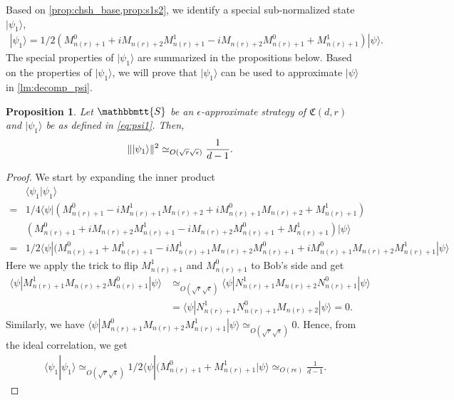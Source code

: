 \documentclass[11pt,letterpaper]{article}
\newcommand{\ket}[1]{|#1\rangle}
\newcommand{\bra}[1]{\langle#1|}
\newcommand{\braket}[2]{\langle#1|#2\rangle}
\DeclarePairedDelimiter{\norm}{\lVert}{\rVert}
\newcommand{\1}{\mathbb{1}}
\newcommand{\nr}{n(r)}
\newcommand{\fC}{\mathfrak{C}}
\newcommand{\bS}{\mathbbmtt{S}}
\newcommand{\ep}{\epsilon}
\newcommand{\se}{\sqrt{\epsilon}}
\newcommand{\qe}{\epsilon^{1/4}}
\newcommand{\sd}{\sqrt{d}}
\newcommand{\sr}{\sqrt{r}}
\newcommand{\appd}[1]{\simeq_{#1}}
\newtheorem{proposition}[theorem]{Proposition}
\theoremstyle{definition}
\begin{document}
Based on \cref{prop:chsh_base,prop:s1s2}, we identify a special sub-normalized state $\ket{\psi_1}$, 
\begin{align}
    \label{eq:psi1}
	\ket{\psi_1} =1/2(M_{\nr+1}^0 + iM_{\nr+2}M_{\nr+1}^1 - iM_{\nr+2}M_{\nr+1}^0 +M_{\nr+1}^1) \ket{\psi}.
\end{align}
The special properties of $\ket{\psi_1}$ are summarized
in the propositions below. 
Based on the properties of $\ket{\psi_1}$, we will prove that $\ket{\psi_1}$ can be used to approximate $\ket{\psi}$
in \cref{lm:decomp_psi}.
\begin{proposition}
    \label{prop:psi1_norm}
	Let $\bS$ be an $\ep$-approximate strategy of $\fC(d,r)$ and $\ket{\psi_1}$ be as defined in
	\cref{eq:psi1}.
	Then, 
	\begin{align}
	 \label{eq:psi1_norm} &\norm{\ket{\psi_1}}^2 \appd{O(\sr\se)} \frac{1}{d-1}.
	\end{align}
\end{proposition}
\begin{proof}
	We start by expanding the inner product
	\begin{align*}
		&\braket{\psi_1}{\psi_1} \\
		=&1/4\bra{\psi}(M_{\nr+1}^0 - iM_{\nr+1}^1M_{\nr+2} + iM_{\nr+1}^0M_{\nr+2} +M_{\nr+1}^1)\\
		&(M_{\nr+1}^0 + iM_{\nr+2}M_{\nr+1}^1 -iM_{\nr+2}M_{\nr+1}^0 + M_{\nr+1}^1)\ket{\psi}\\
		=&1/2\bra{\psi}(M_{\nr+1}^0+M_{\nr+1}^1-iM_{\nr+1}^1M_{\nr+2}M_{\nr+1}^0+iM_{\nr+1}^0M_{\nr+2}M_{\nr+1}^1\ket{\psi}
	\end{align*}
	Here we apply the trick to flip $M_{\nr+1}^1$ and $M_{\nr+1}^0$ to Bob's side and get 
	\begin{align*}
		\bra{\psi}M_{\nr+1}^1M_{\nr+2}M_{\nr+1}^0\ket{\psi} 
		&\appd{O(\sr\se)} \bra{\psi}N_{\nr+1}^1M_{\nr+2}N_{\nr+1}^0\ket{\psi} \\
		&= \bra{\psi}N_{\nr+1}^1N_{\nr+1}^0M_{\nr+2}\ket{\psi} = 0.
	\end{align*}
	Similarly, we have $\bra{\psi}M_{\nr+1}^0M_{\nr+2}M_{\nr+1}^1\ket{\psi} \appd{ O(\sr \se)} 0$.
	Hence, from the ideal correlation, we get 
	\begin{align}
		\braket{\psi_1}{\psi_1} \appd{O(\sr\se)} 1/2\bra{\psi}(M_{\nr+1}^0+M_{\nr+1}^1\ket{\psi} \appd{O(r\ep)} 
		 \frac{1}{d-1}.
	\end{align}
\end{proof}
\end{document}
